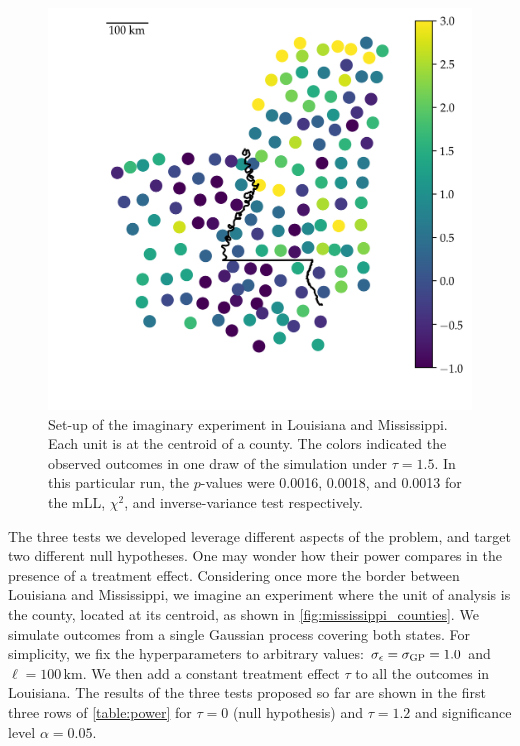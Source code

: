 \begin{figure}[tb]
    \centering
    \includegraphics[height=0.4\textheight]{figures/mississippi_sim.png}
    \caption{
		\label{fig:mississippi_counties}
		Set-up of the imaginary experiment in Louisiana and Mississippi. Each unit is at the centroid of a county. The colors indicated the observed outcomes in one draw of the simulation under \(\tau=1.5\). In this particular run, the \(p\)-values were 0.0016, 0.0018, and 0.0013 for the mLL, \(\chi^2\), and inverse-variance test respectively.}
\end{figure}

	The three tests we developed leverage different aspects of the problem, and target two different null hypotheses. One may wonder how their power compares in the presence of a treatment effect. Considering once more the border between Louisiana and Mississippi, we imagine an experiment where the unit of analysis is the county, located at its centroid, as shown in \autoref{fig:mississippi_counties}.
We simulate outcomes from a single Gaussian process covering both states. For simplicity, we fix the hyperparameters to arbitrary values: \(\sigma_{\epsilon}=\sigma_{\mathrm{GP}}=1.0\) and \(\ell=100\,\mathrm{km}\).
We then add a constant treatment effect \(\tau\) to all the outcomes in Louisiana.
The results of the three tests proposed so far are shown in the first three rows of \autoref{table:power} for \(\tau=0\) (null hypothesis) and \(\tau=1.2\) and significance level \(\alpha=0.05\).


